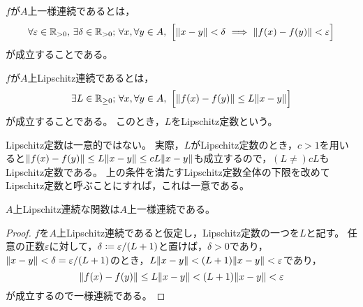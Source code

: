 \documentclass[b5paper,draft]{ltjsbook}
\begin{document}
\begin{defi}[一様連続性]
    $f$が$A$上一様連続であるとは，
    \begin{equation}
        \forall \varepsilon\in\Rposi,\, \exists \delta \in \Rposi;\,  \forall x, \forall y \in A,\ \bsqu{
            \norm{x-y}<\delta \ \Longrightarrow\ \norm{\fun{f}{x}-\fun{f}{y}}<\varepsilon
        }
    \end{equation}
    が成立することである。
\end{defi}

\begin{defi}[Lipschitz連続性]
    $f$が$A$上Lipschitz連続であるとは，
    \begin{equation}
        \exists L\in \Rnonnega;\, \forall x, \forall y \in A,\ \bsqu{
            \norm{\fun{f}{x}-\fun{f}{y}}\leq L \norm{x - y}
        }
    \end{equation}
    が成立することである。
    このとき，$L$をLipschitz定数という。
\end{defi}

\begin{rem}
    Lipschitz定数は一意的ではない。
    実際，$L$がLipschitz定数のとき，$c>1$を用いると$\norm{\fun{f}{x}-\fun{f}{y}}\leq L \norm{x - y}\leq cL \norm{x-y}$も成立するので，$(L\neq )cL$もLipschitz定数である。
    上の条件を満たすLipschitz定数全体の下限を改めてLipschitz定数と呼ぶことにすれば，これは一意である。
\end{rem}

\begin{prop}
    $A$上Lipschitz連続な関数は$A$上一様連続である。
    \begin{proof}
        $f$を$A$上Lipschitz連続であると仮定し，Lipschitz定数の一つを$L$と記す。
        任意の正数$\varepsilon$に対して，$\delta \coloneqq \varepsilon / \pare{L+1}$と置けば，$\delta >0$であり，$\norm{x-y}<\delta = {\varepsilon}/\pare{L+1}$のとき，$L\norm{x-y}<\pare{L+1}\norm{x-y}<\varepsilon$であり，
        \begin{equation}
            \norm{\fun{f}{x} - \fun{f}{y}} \leq L \norm{x - y}<\pare{L+1}\norm{x-y}<\varepsilon
        \end{equation}
        が成立するので一様連続である。
    \end{proof}
\end{prop}
\end{document}
